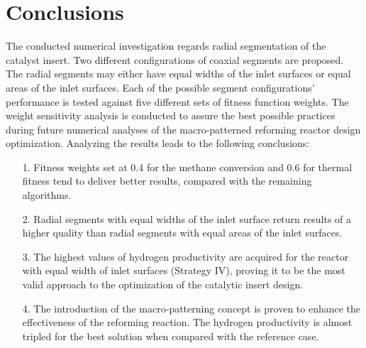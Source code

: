 \documentclass[preprint,12pt]{elsarticle}
\begin{document}

\section{Conclusions}

The conducted numerical investigation regards radial segmentation of the catalyst insert. Two different configurations of coaxial segments are proposed. The radial segments may either have equal widths of the inlet surfaces or equal areas of the inlet surfaces. Each of the possible segment configurations' performance is tested against five different sets of fitness function weights. The weight sensitivity analysis is conducted to assure the best possible practices during future numerical analyses of the macro-patterned reforming reactor design optimization. Analyzing the results leads to the following conclusions:

\begin{itemize}
\item [1.] Fitness weights set at 0.4 for the methane conversion and 0.6 for thermal fitness tend to deliver better results, compared with the remaining algorithms.  
\item[2.] Radial segments with equal widths of the inlet surface return results of a higher quality than radial segments with equal areas of the inlet surfaces.
\item[3.] The highest values of hydrogen productivity are acquired for the reactor with equal width of inlet surfaces (Strategy IV),  proving it to be the most valid approach to the optimization of the catalytic insert design.
\item[4.] The introduction of the macro-patterning concept is proven to enhance the effectiveness of the reforming reaction. The hydrogen productivity is almost tripled for the best solution when compared with the reference case.
\end{itemize}
\end{document}
